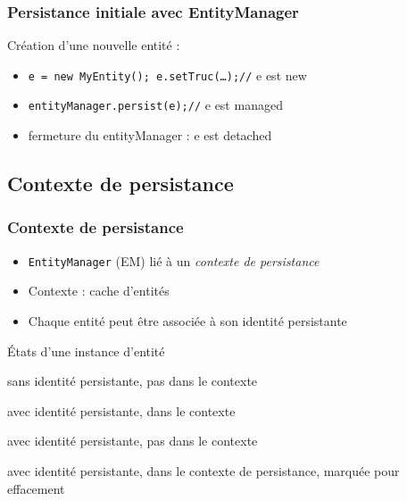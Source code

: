 \documentclass[english, french]{beamer}
\begin{document}
\begin{frame}
	\frametitle{Persistance initiale avec EntityManager}
	Création d’une nouvelle entité :
	\begin{itemize}
		\item \texttt{e = new MyEntity(); e.setTruc(…);//} e est \og{}new\fg{}
		\item \texttt{entityManager.persist(e);//} e est \og{}managed\fg{}
		\item fermeture du entityManager : e est \og{}detached\fg{}
	\end{itemize}
\end{frame}

\subsection{Contexte de persistance}
\begin{frame}
	\frametitle{Contexte de persistance}
	\begin{itemize}
		\item \texttt{EntityManager} (EM) lié à un \emph{contexte de persistance}
		\item Contexte : cache d’entités
		\item Chaque entité peut être associée à son identité persistante
	\end{itemize}
	\begin{block}{États d’une instance d’entité}
		\begin{description}[detached]
			\item[new] sans identité persistante, pas dans le contexte
			\item[managed] avec identité persistante, dans le contexte
			\item[detached] avec identité persistante, pas dans le contexte
			\item[removed] avec identité persistante, dans le contexte de persistance, marquée pour effacement
		\end{description}
	\end{block}
\end{frame}
\end{document}
